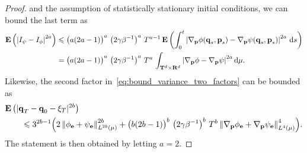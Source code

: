 \documentclass[11pt,a4paper]{article}
\newcommand{\expect}[0]{\mathbf{E}}
\newcommand{\real}{\mathbf R}
\newcommand{\torus}{\mathbf T}
\newcommand{\grad}{\nabla}
\newcommand{\vect}[1]{\boldsymbol{\mathbf #1}}
\renewcommand{\d}{\mathrm d}
\theoremstyle{plain}
\numberwithin{equation}{section}
\renewcommand{\leq}{\leqslant}
\begin{document}
\begin{proof}
    and the assumption of statistically stationary initial conditions,
    we can bound the last term as
    \begin{align*}
        \expect \left( \abs{I_{\psi} - I_{\phi}}^{2 a} \right)
        &\leq \bigl( a(2 a - 1)\bigr)^a \, \left(2 \gamma \beta^{-1}\right)^a \,  T^{a-1} \,
        \expect \left(\int_{0}^{t} \abs{\grad_{\vect p} \phi(\vect q_s, \vect p_s) - \grad_{\vect p} \psi(\vect q_s, \vect p_s)}^{2a} \, \d s\right) \\
        &= \bigl(a(2a - 1)\bigr)^a \, \left(2 \gamma \beta^{-1}\right)^a \,  T^{a} \, \int_{\torus^d \times \real^d} \abs{\grad_{\vect p} \phi - \grad_{\vect p} \psi}^{2a} \d \mu.
    \end{align*}
    Likewise, the second factor in~\eqref{eq:bound_variance_two_factors} can be bounded as
    \begin{align*}
        &\expect \left( |\vect q_T - \vect q_0 - \xi_T|^{2b} \right) \\
        &\qquad
        \leq 3^{2b-1} \Bigl( 2 \norm{\phi_{\vect e} + \psi_{\vect e}}[L^{2b}(\mu)]^{2b}
        + \bigl(b(2b - 1)\bigr)^b \, \left(2 \gamma \beta^{-1}\right)^b \, T^{b} \norm{\grad_{\vect p} \phi_{\vect e} + \grad_{\vect p} \psi_{\vect e}}[L^{4}(\mu)]^4 \Bigr).
    \end{align*}
    The statement is then obtained by letting $a = 2$.
\end{proof}
\end{document}
